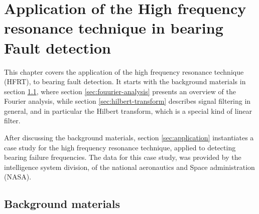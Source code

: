 \documentclass[../Main/thesis.tex]{subfiles}
\begin{document}
\chapter[Application of the High frequency resonance technique in bearing Fault detection]{Application of the High frequency resonance technique in bearing Fault detection}
\label{sec:chapter2}
This chapter covers the application of the high frequency resonance technique (HFRT), to bearing fault detection. It starts with the background materials in section \ref{sec:background-material}, where section \ref{sec:fouurier-analysis} presents an overview of the Fourier analysis, while section \ref{sec:hilbert-transform} describes signal filtering in general, and in particular the Hilbert transform, which is a special kind of linear filter.

\justify
After discussing the background materials, section \ref{sec:application} instantiates a case study for the high frequency resonance technique, applied to detecting bearing failure frequencies. The data for this case study, was provided by the intelligence system division, of the national aeronautics and Space administration (NASA).

\section{Background materials}
\label{sec:background-material}
\end{document}
